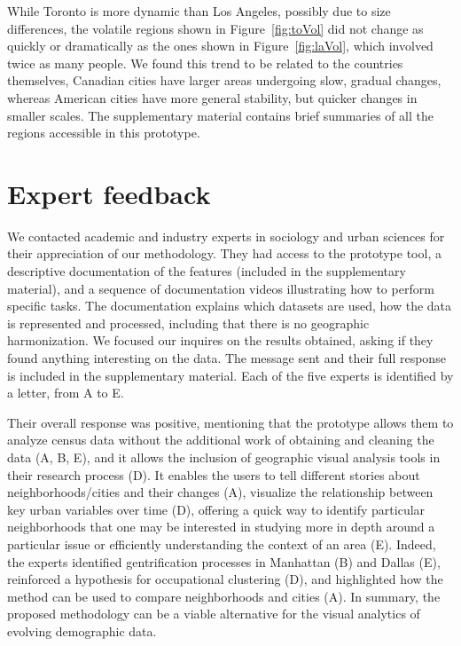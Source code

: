 \smallskip While Toronto is more dynamic than Los Angeles, possibly due to size
differences, the volatile regions shown in Figure~\ref{fig:toVol} did not change
as quickly or dramatically as the ones shown in Figure~\ref{fig:laVol}, which
involved twice as many people. We found this trend to be related to the
countries themselves, Canadian cities have larger areas undergoing slow, gradual
changes, whereas American cities have more general stability, but quicker
changes in smaller scales. The supplementary material contains brief summaries
of all the regions accessible in this prototype.




\section{Expert feedback}
We contacted academic and industry experts in sociology and urban sciences for
their appreciation of our methodology. They had access to the prototype tool, a
descriptive documentation of the features (included in the supplementary
material), and a sequence of documentation videos illustrating how to perform
specific tasks. The documentation explains which datasets are used, how the data
is represented and processed, including that there is no geographic
harmonization. We focused our inquires on the results obtained, asking if they
found anything interesting on the data. The message sent and their full response
is included in the supplementary material. Each of the five experts is
identified by a letter, from A to E. 



Their overall response was positive,  mentioning that the prototype allows them
to analyze census data without the additional work of obtaining and cleaning the
data (A, B, E), and it allows the inclusion of geographic visual analysis tools
in their research process (D). It enables the users to tell different stories
about neighborhoods/cities and their changes (A), visualize the relationship
between key urban variables over time (D), offering a quick way to identify
particular neighborhoods that one may be interested in studying more in depth
around a particular issue or efficiently understanding the context of an area
(E).  Indeed, the experts identified gentrification processes in Manhattan (B)
and Dallas (E), reinforced a hypothesis for occupational clustering (D), and
highlighted how the method can be used to compare neighborhoods and cities (A).
In summary, the proposed methodology can be a viable alternative for the visual
analytics of evolving demographic data.



